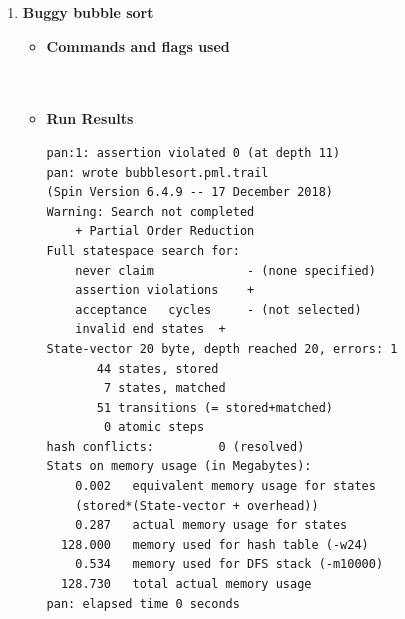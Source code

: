 \documentclass[10pt]{article}
\begin{document}
\begin{enumerate}
\item \textbf{Buggy bubble sort}\\
  \begin{itemize}
      \item 
  \textbf{Commands and flags used}\\
  \\
  \\
 \item \textbf{Run Results}
  \begin{Verbatim}[frame=single]
pan:1: assertion violated 0 (at depth 11)
pan: wrote bubblesort.pml.trail
(Spin Version 6.4.9 -- 17 December 2018)
Warning: Search not completed
	+ Partial Order Reduction
Full statespace search for:
	never claim         	- (none specified)
	assertion violations	+
	acceptance   cycles 	- (not selected)
	invalid end states	+
State-vector 20 byte, depth reached 20, errors: 1
       44 states, stored
        7 states, matched
       51 transitions (= stored+matched)
        0 atomic steps
hash conflicts:         0 (resolved)
Stats on memory usage (in Megabytes):
    0.002	equivalent memory usage for states 
    (stored*(State-vector + overhead))
    0.287	actual memory usage for states
  128.000	memory used for hash table (-w24)
    0.534	memory used for DFS stack (-m10000)
  128.730	total actual memory usage
pan: elapsed time 0 seconds


\end{Verbatim}
\end{itemize}
\end{enumerate}
\end{document}
